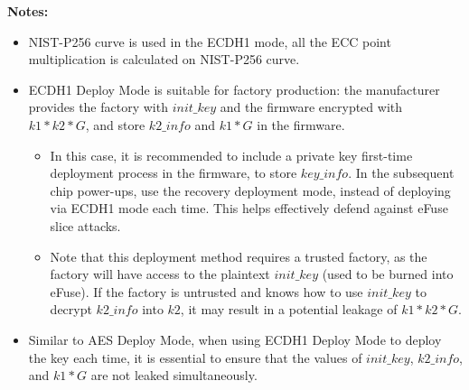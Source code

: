\documentclass[main\_\_EN.tex]{subfiles}
\begin{document}
\textbf{Notes:}\\
\begin{itemize}
    \item NIST-P256 curve is used in the ECDH1 mode, all the ECC point multiplication is calculated on NIST-P256 curve.
    \item ECDH1 Deploy Mode is suitable for factory production: the manufacturer provides the factory with \begin{math}init\_key\end{math} and the firmware encrypted with \begin{math}k1*k2*G\end{math}, and store \begin{math}k2\_info\end{math} and \begin{math}k1*G\end{math} in the firmware.
    \begin{itemize}
        \item In this case, it is recommended to include a private key first-time deployment process in the firmware, to store \hyperref[para:keyinfo]{\begin{math}key\_info\end{math}}. In the subsequent chip power-ups, use the recovery deployment mode, instead of deploying via ECDH1 mode each time. This helps effectively defend against eFuse slice attacks.
        \item Note that this deployment method requires a trusted factory, as the factory will have access to the plaintext \begin{math}init\_key\end{math} (used to be burned into eFuse). If the factory is untrusted and knows how to use \begin{math}init\_key\end{math} to decrypt \begin{math}k2\_info\end{math} into \begin{math}k2\end{math}, it may result in a potential leakage of \begin{math}k1*k2*G\end{math}.
    \end{itemize}
    \item Similar to AES Deploy Mode, when using ECDH1 Deploy Mode to deploy the key each time, it is essential to ensure that the values of \begin{math}init\_key\end{math}, \begin{math}k2\_info\end{math}, and \begin{math}k1*G\end{math} are not leaked simultaneously.

\end{itemize}
\end{document}
